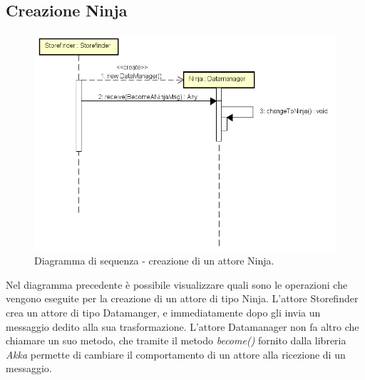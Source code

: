 \documentclass[a4paper]{article}
\begin{document}
        \subsection{Creazione Ninja}
            \begin{figure} [H]
				\centering
				\includegraphics[width=\textwidth]{ST/seq/CreazioneNinja.png}
				\caption{Diagramma di sequenza - creazione di un attore Ninja.}
			\end{figure}
            Nel diagramma precedente è possibile visualizzare quali sono le operazioni che vengono eseguite per la creazione di un attore di tipo Ninja. 
            L'attore Storefinder crea un attore di tipo Datamanger, e immediatamente dopo gli invia un messaggio dedito alla sua trasformazione. L'attore 
            Datamanager non fa altro che chiamare un suo metodo, che tramite il metodo \textit{become()} fornito dalla libreria \textit{Akka} permette di 
            cambiare il comportamento di un attore alla ricezione di un messaggio.
         
\end{document}

